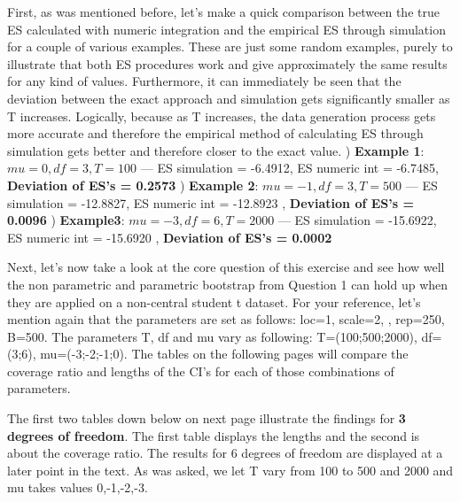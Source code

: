 \documentclass[12pt]{article}
\begin{document}
First, as was mentioned before, let's make a quick comparison between the true ES calculated with numeric integration and the empirical ES through simulation for a couple of various examples. These are just some random examples, purely to illustrate that both ES procedures work and give approximately the same results for any kind of values. Furthermore, it can immediately be seen that the deviation between the exact approach and simulation gets significantly smaller as T increases. Logically, because as T increases, the data generation process gets more accurate and therefore the empirical method of calculating ES through simulation gets better and therefore closer to the exact value. \newline {}) \textbf{Example 1}: $mu = 0, df = 3, T = 100$     \newline ---     ES simulation = -6.4912, ES numeric int = -6.7485,  \textbf{Deviation of ES's = 0.2573}  ) \textbf{Example 2}: $mu = -1, df =3, T = 500$ \newline --- ES simulation = -12.8827, ES numeric int = -12.8923 , \textbf{Deviation of ES's = 0.0096} ) \textbf{Example3}: $mu = -3, df = 6, T = 2000$  \newline--- ES simulation = -15.6922, ES numeric int = -15.6920 , \textbf{Deviation of ES's = 0.0002}\newline\newline

Next, let's now take a look at the core question of this exercise and see how well the non parametric and parametric bootstrap from Question 1 can hold up when they are applied on a non-central student t dataset.
For your reference, let's mention again that the parameters are set as follows: loc=1, scale=2, , rep=250, B=500. \newline 
The parameters T, df and mu vary as following: T=(100;500;2000), df= (3;6), mu=(-3;-2;-1;0). The tables on the following pages will compare the coverage ratio and lengths of the CI's for each of those combinations of parameters. \newline 

The first two tables down below on next page illustrate the findings for \textbf{3 degrees of freedom}. The first table displays the lengths and the second is about the coverage ratio. The results for 6 degrees of freedom are displayed at a later point in the text. \newline
As was asked, we let T vary from 100 to 500 and 2000 and mu takes values 0,-1,-2,-3. 
\end{document}
